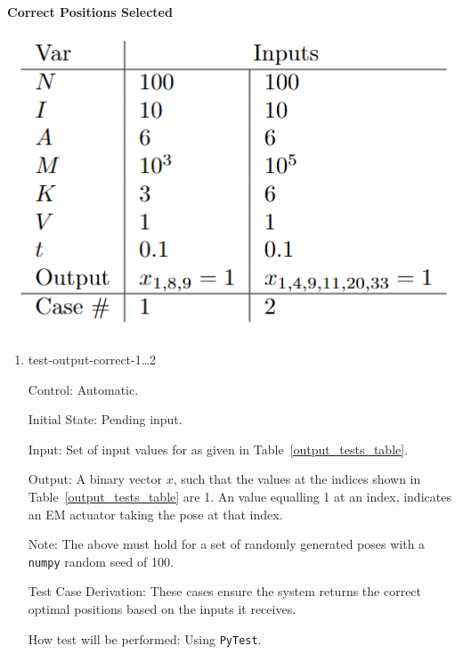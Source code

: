 \documentclass[12pt, titlepage]{article}
\begin{document}
\paragraph{Correct Positions Selected}
\begin{center}
  \includegraphics[scale=0.5]{OutputTable.PNG} \\
  \label{output_tests_table}
\end{center}

\begin{enumerate}

  \item{test-output-correct-1\dots2\\}
  
  Control: Automatic.
            
  Initial State: Pending input.
            
  Input: Set of input values for as given in Table~\ref{output_tests_table}.
            
  Output: A binary vector $x$, such that the values at the indices shown in Table~\ref{output_tests_table} are 1. An value equalling 1 at an index, indicates an EM actuator taking the pose at that index.

  Note: The above must hold for a set of randomly generated poses with a \texttt{numpy} random seed of 100. 
  
  Test Case Derivation: These cases ensure the system returns the correct optimal positions based on the inputs it receives. 
            
  How test will be performed: Using \texttt{PyTest}. 
\end{enumerate}
\end{document}
